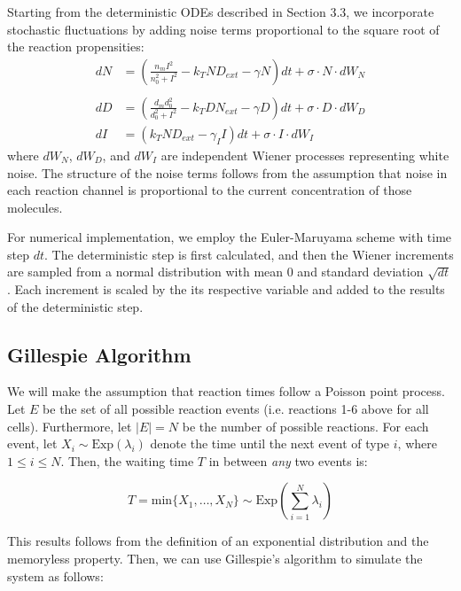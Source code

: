 \documentclass{article}
\begin{document}
\begin{flushleft}
Starting from the deterministic ODEs described in Section 3.3, we incorporate stochastic fluctuations by adding noise terms proportional to the square root of the reaction propensities:
$$
\begin{aligned}
  dN &= \left( \frac{n_{m}I^2}{n_{0}^2 + I^2} - k_{T}ND_{ext} - \gamma N \right) dt + \sigma \cdot N \cdot dW_{N} \\ \\[5pt]
  dD &= \left( \frac{d_{m}d_{0}^2}{d_{0}^2 + I^2} - k_{T}DN_{ext} - \gamma D \right)  dt + \sigma \cdot D \cdot dW_{D}  \\[5pt]
  dI &= \left( k_{T}ND_{ext} - \gamma_{I}I \right) dt + \sigma \cdot I \cdot dW_{I}
\end{aligned}
$$
where $dW_N$, $dW_D$, and $dW_I$ are independent Wiener processes representing white noise. The structure of the noise terms follows from the assumption that noise in each reaction channel is proportional to the current concentration of those molecules. \par

For numerical implementation, we employ the Euler-Maruyama scheme with time step $dt$. The deterministic step is first calculated, and then the Wiener increments are sampled from a normal distribution with mean 0 and standard deviation $\sqrt{dt}$. Each increment is scaled by the its respective variable and added to the results of the deterministic step.

\subsection{Gillespie Algorithm}

We will make the assumption that reaction times follow a Poisson point process. Let $E$ be the set of all possible reaction events (i.e. reactions 1-6 above for all cells). Furthermore, let $|E| = N$ be the number of possible reactions. For each event, let $X_{i} \sim \text{Exp}(\lambda_{i})$ denote the time until the next event of type $i$, where $1 \leq i \leq N$. Then, the waiting time $T$ in between \emph{any} two events is:

$$
T = \text{min} \{ X_{1}, \dots, X_{N} \} \sim \text{Exp}\left( \sum_{i = 1}^{N} \lambda_{i} \right) 
$$

This results follows from the definition of an exponential distribution and the memoryless property. Then, we can use Gillespie's algorithm to simulate the system as follows:

\medskip


\end{flushleft}
\end{document}
